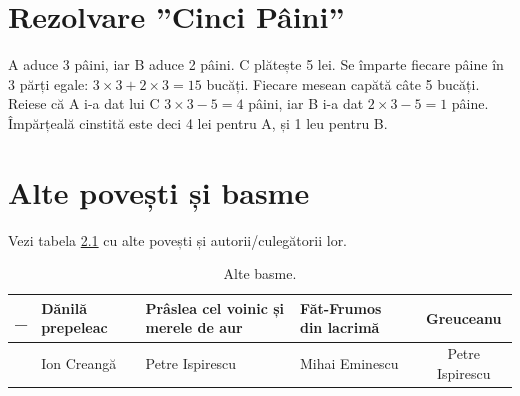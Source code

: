 \chapter {Rezolvare ''Cinci Pâini''}
A aduce 3 pâini, iar B aduce 2 pâini. C plătește 5 lei.  Se împarte
fiecare pâine în 3 părți egale: $3 \times 3 + 2 \times 3 = 15$
bucăți. Fiecare mesean capătă câte 5 bucăți. Reiese că A i-a dat lui C
$3 \times 3 - 5 = 4$ pâini, iar B i-a dat $2 \times 3 - 5 = 1$
pâine. Împărțeală cinstită este deci 4 lei pentru A, și 1 leu pentru B.

\chapter{Alte povești și basme}

 Vezi tabela \ref{altebasme} cu alte povești și autorii/culegătorii lor.



\begin{table}
\begin{tabular}[t]{c|p{3cm}|p{3cm}|p{3cm}|c}
\_ & Dănilă prepeleac & Prâslea cel voinic și merele de aur & Făt-Frumos din lacrimă & Greuceanu \\
\hline
 & Ion Creangă & Petre Ispirescu & Mihai Eminescu & Petre Ispirescu \\
\end{tabular}
\label{altebasme}
\caption{Alte basme.}
\end{table}